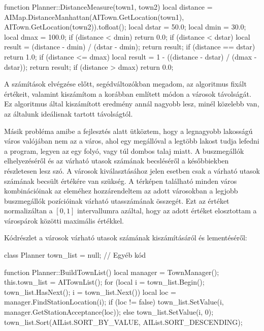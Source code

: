 \begin{cpp}
function Planner::DistanceMeasure(town1, town2)
{
  local distance = AIMap.DistanceManhattan(AITown.GetLocation(town1),
    AITown.GetLocation(town2)).tofloat();
  local dstar = 50.0;
  local dmin = 30.0;
  local dmax = 100.0;
  if (distance < dmin) {
    return 0.0;
  }
  if (distance < dstar) {
    local result = (distance - dmin) / (dstar - dmin);
    return result;
  }
  if (distance == dstar) {
    return 1.0;
  }
  if (distance <= dmax) {
    local result = 1 - ((distance - dstar) / (dmax - dstar));
    return result;
  }
  if (distance > dmax) {
    return 0.0;
  }
}
\end{cpp}

A számítások elvégzése előtt, segédváltozókban megadom, az algoritmus fixált értékeit, valamint kiszámítom a korábban említett módon a városok távolságát. Ez algoritmus által kiszámított eredmény annál nagyobb lesz, minél közelebb van, az általunk ideálisnak tartott távolságtól.

Másik probléma amibe a fejlesztés alatt ütköztem, hogy a legnagyobb lakosságú város valójában nem az a város, ahol egy megállóval a legtöbb lakost tudja lefedni a program, legyen az egy folyó, vagy túl dombos talaj miatt. A buszmegállók elhelyezéséről és az várható utasok számának becsléséről a későbbiekben részletesen lesz szó. A városok kiválasztásához jelen esetben csak a várható utasok számának becsült értékére van szükség. A térképen található minden város kombinációinak az eleméhez hozzárendeltem az adott városokban a legjobb buszmegállók pozícióinak várható utasszámának összegét. Ezt az értéket normalizáltan a $[0, 1]$ intervallumra azáltal, hogy az adott értéket elosztottam a várospárok közötti maximális értékkel.

Kódrészlet a városok várható utasok számának kiszámításáról és lementéséről:
\begin{cpp}

class Planner {
  town_list = null;
  // Egyéb kód
}

function Planner::BuildTownList()
{
  local manager = TownManager();
  this.town_list = AITownList();
  for (local i = town_list.Begin(); 
   town_list.HasNext(); i = town_list.Next()) {
    local loc = manager.FindStationLocation(i);
    if (loc != false) {
      town_list.SetValue(i, manager.GetStationAcceptance(loc));
    } else {
      town_list.SetValue(i, 0);
    }
  }
  town_list.Sort(AIList.SORT_BY_VALUE, AIList.SORT_DESCENDING);
}
\end{cpp}

